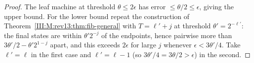 \begin{proof}
The leaf machine at threshold $\theta\le2\epsilon$ has error $\le\theta/2\le\epsilon$, giving
the upper bound. For the lower bound repeat the construction of
Theorem~\ref{III:M:rev13:thm:fib-general} with $T=\ell'+j$ at threshold $\theta'=2^{-\ell'}$: the
final states are within $\theta'2^{-j}$ of the endpoints, hence pairwise more than
$3\theta'/2-\theta'2^{1-j}$ apart, and this exceeds $2\epsilon$ for large $j$ whenever
$\epsilon<3\theta'/4$. Take $\ell'=\ell$ in the first case and $\ell'=\ell-1$ (so
$3\theta'/4=3\theta/2>\epsilon$) in the second.
\end{proof}
